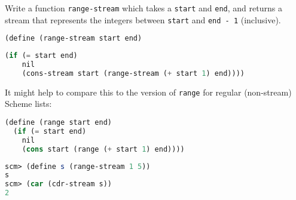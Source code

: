 \question Write a function \texttt{range-stream} which takes a \texttt{start}
and \texttt{end}, and returns a stream that represents the integers between
\texttt{start} and \texttt{end - 1} (inclusive).

\begin{lstlisting}[language=Scheme]
(define (range-stream start end)
\end{lstlisting}
\begin{solution}[1.25in]
\begin{lstlisting}[language=Scheme]
  (if (= start end)
    nil
    (cons-stream start (range-stream (+ start 1) end))))
\end{lstlisting}

It might help to compare this to the version of \texttt{range} for regular
(non-stream) Scheme lists:
\begin{lstlisting}[language=Scheme]
(define (range start end)
  (if (= start end)
    nil
    (cons start (range (+ start 1) end))))
\end{lstlisting}

\end{solution}

\begin{lstlisting}[language=Scheme]
scm> (define s (range-stream 1 5))
s
scm> (car (cdr-stream s))
2
\end{lstlisting}

